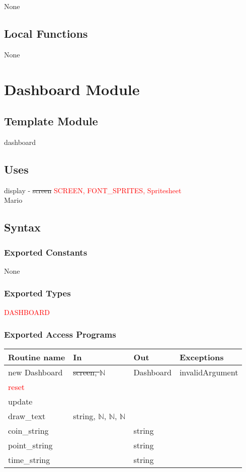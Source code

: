 \documentclass[12pt]{article}
\begin{document}
None

\subsection* {Local Functions}

None

\newpage

\section* {Dashboard Module}

\subsection*{Template Module}

dashboard

\subsection {Uses}

display - \sout{screen} \textcolor{red}{SCREEN, FONT\_SPRITES, Spritesheet} \\
Mario

\subsection* {Syntax}

\subsubsection *{Exported Constants}

None

\subsubsection* {Exported Types}

\textcolor{red}{DASHBOARD}

\subsubsection* {Exported Access Programs}

\begin{tabular}{| l | l | l | l |}
\hline
\textbf{Routine name} & \textbf{In} & \textbf{Out} & \textbf{Exceptions}\\
\hline
new Dashboard & \sout{screen, $\mathbb{N}$} & Dashboard & invalidArgument\\
\hline
\textcolor{red}{reset} & & & \\
\hline
update & & & \\
\hline
draw\_text & string, $\mathbb{N}$, $\mathbb{N}$, $\mathbb{N}$ & & \\
\hline
coin\_string & & string & \\
\hline
point\_string & & string & \\
\hline
time\_string & & string & \\
\hline
\end{tabular}
\end{document}
